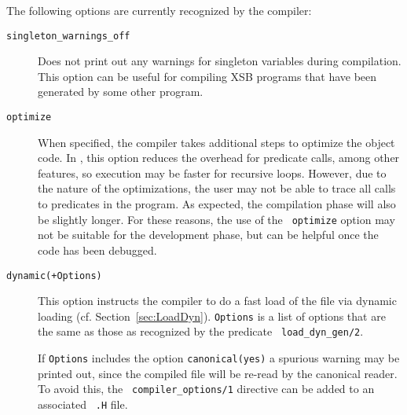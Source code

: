 The following options are currently recognized by the compiler:
\begin{description}
\item[{\tt singleton\_warnings\_off}] Does not print out any warnings
  for singleton variables during compilation.  This option can be
  useful for compiling XSB programs that have been generated by some
  other program.
%
\item[{\tt optimize}] When
  specified, the compiler takes additional steps to optimize the
  object code.  In \version, this option reduces the overhead for
  predicate calls, among other features, so execution may be faster
  for recursive loops.  However, due to the nature of the
  optimizations, the user may not be able to trace all calls to
  predicates in the program.  As expected, the compilation phase will
  also be slightly longer.  For these reasons, the use of the {\tt
    optimize} option may not be suitable for the development phase,
  but can be helpful once the code has been debugged.
\item[{\tt dynamic(+Options)}] This option instructs the compiler to
  do a fast load of the file via dynamic loading
  (cf. Section~\ref{sec:LoadDyn}).  {\tt Options} is a list of options
  that are the same as those as recognized by the predicate {\tt
    load\_dyn\_gen/2}.

  If {\tt Options} includes the option {\tt canonical(yes)} a spurious
  warning may be printed out, since the compiled file will be re-read
  by the canonical reader.  To avoid this, the {\tt
    compiler\_options/1} directive can be added to an associated {\tt
    .H} file.
  

\end{description}
